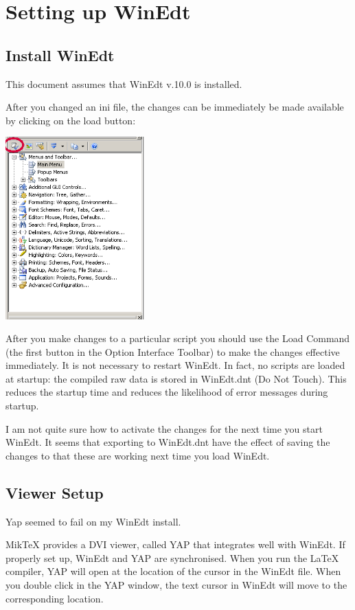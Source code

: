 
\chapter{Setting up WinEdt}

\section{Install WinEdt}
\label{sec:installwinedt}
This document assumes that WinEdt v.10.0 is installed.

After you changed an ini file, the changes can be immediately be made available by clicking on the load button:

\centerline{\includegraphics[bb= 0 0 295 388, width=0.4\textwidth]{eps/loadini.png}}

After you make changes to a particular script you should use the Load Command (the first button in the Option Interface Toolbar) to make the changes effective immediately. It is not necessary to restart WinEdt. In fact, no scripts are loaded at startup: the compiled raw data is stored in WinEdt.dnt (Do Not Touch). This reduces the startup time and reduces the likelihood of error messages during startup.


I am not quite sure how to activate the changes for the next time you start WinEdt.  It seems that exporting to WinEdt.dnt have the effect of saving the changes to that these are working next time you load WinEdt.

\section{Viewer Setup}

Yap seemed to fail on my WinEdt install.

MikTeX provides a DVI viewer, called YAP that integrates well with WinEdt. If properly set up, WinEdt and YAP are synchronised. When you run the \LaTeX{} compiler, YAP will open at the location of the cursor in the WinEdt file. When you double click in the YAP window, the text cursor in WinEdt will move to the corresponding location.

